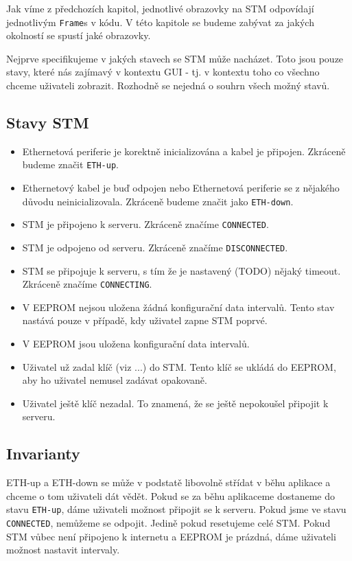 
Jak víme z předchozích kapitol, jednotlivé obrazovky na STM odpovídají jednotlivým
\texttt{Frame}s v kódu.
V této kapitole se budeme zabývat za jakých okolností se spustí jaké obrazovky.

Nejprve specifikujeme v jakých stavech se STM může nacházet.
Toto jsou pouze stavy, které nás zajímavý v kontextu GUI - tj. v kontextu toho co všechno chceme
uživateli zobrazit.
Rozhodně se nejedná o souhrn všech možný stavů.
\subsection{Stavy STM}
\begin{itemize}
  \item Ethernetová periferie je korektně inicializována a kabel je připojen. Zkráceně budeme
        značit \texttt{ETH-up}.
  \item Ethernetový kabel je buď odpojen nebo Ethernetová periferie se z nějakého důvodu
        neinicializovala. Zkráceně budeme značit jako \texttt{ETH-down}.
  \item STM je připojeno k serveru. Zkráceně značíme \texttt{CONNECTED}.
  \item STM je odpojeno od serveru. Zkráceně značíme \texttt{DISCONNECTED}.
  \item STM se připojuje k serveru, s tím že je nastavený (TODO) nějaký timeout. Zkráceně značíme
        \texttt{CONNECTING}.
  \item V EEPROM nejsou uložena žádná konfigurační data intervalů. Tento stav nastává pouze v případě,
        kdy uživatel zapne STM poprvé.
  \item V EEPROM jsou uložena konfigurační data intervalů.
  \item Uživatel už zadal klíč (viz ...) do STM. Tento klíč se ukládá do EEPROM, aby ho uživatel
        nemusel zadávat opakovaně.
  \item Uživatel ještě klíč nezadal. To znamená, že se ještě nepokoušel připojit k serveru.
\end{itemize}

\subsection{Invarianty}
ETH-up a ETH-down se může v podstatě libovolně střídat v běhu aplikace a chceme o tom uživateli
dát vědět.
Pokud se za běhu aplikaceme dostaneme do stavu \texttt{ETH-up}, dáme uživateli možnost připojit
se k serveru.
Pokud jsme ve stavu \texttt{CONNECTED}, nemůžeme se odpojit. Jedině pokud resetujeme celé STM.
Pokud STM vůbec není připojeno k internetu a EEPROM je prázdná, dáme uživateli možnost nastavit
intervaly.

